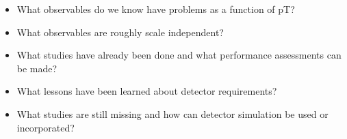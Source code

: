 \label{superboosted}

\begin{itemize}
\item What observables do we know have problems as a function of pT?
\item What observables are roughly scale independent?
\item What studies have already been done and what performance assessments can be made?
\item What lessons have been learned about detector requirements?
\item What studies are still missing and how can detector simulation be used or incorporated?
\end{itemize}